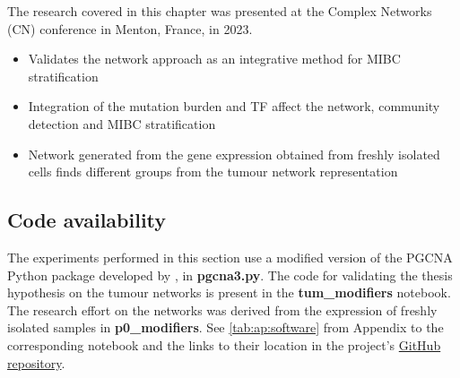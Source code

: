 The research covered in this chapter was presented at the Complex Networks (CN) conference in Menton, France, in 2023.

\begin{itemize}
    \item Validates the network approach as an integrative method for MIBC stratification
     \item Integration of the mutation burden and TF affect the network, community detection and MIBC stratification
     \item Network generated from the gene expression obtained from freshly isolated cells finds different groups from the tumour network representation
\end{itemize}

\subsection{Code availability} \label{s:N_I:implementation}

The experiments performed in this section use a modified version of the PGCNA Python package developed by \citep{Care2019-ij}, in \textbf{pgcna3.py}. The code for validating the thesis hypothesis on the tumour networks is present in the \textbf{tum\_modifiers} notebook. The research effort on the networks was derived from the expression of freshly isolated samples in \textbf{p0\_modifiers}. See \cref{tab:ap:software} from Appendix to the corresponding notebook and the links to their location in the project's \href{https://github.com/vladUng/PhD_thesis_exp/}{GitHub repository}.